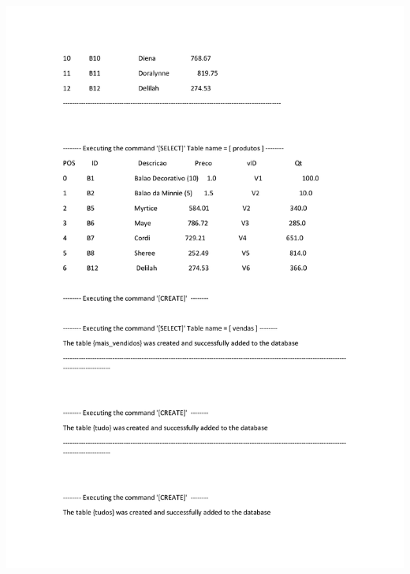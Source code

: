 \documentclass{article}
\begin{document}
\noindent
\includegraphics[width=1.3\textwidth]{5}
\end{document}
